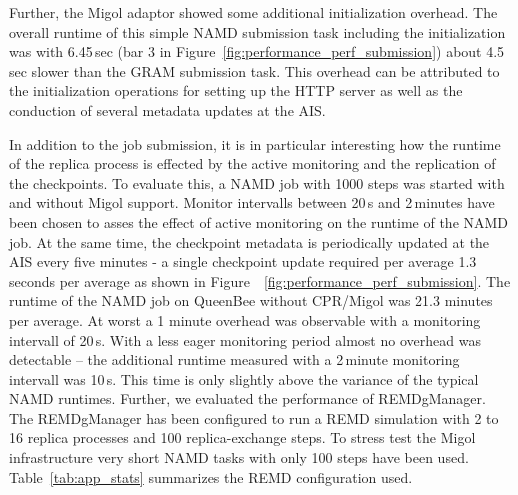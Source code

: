 \documentclass[times, 10pt, twocolumn]{article}
\begin{document}
Further, the Migol adaptor showed some additional initialization overhead.
The overall runtime of this simple NAMD submission task including the 
initialization was with 6.45\,sec (bar 3 in Figure~\ref{fig:performance_perf_submission})
about 4.5\,sec slower than the GRAM submission task. This overhead
can be attributed to the initialization operations for setting 
up the HTTP server as well as the conduction of 
several metadata updates at the AIS.
                                                                                                                    
In addition to the job submission, it is in particular interesting how
the runtime of the replica process is effected by the active
monitoring and the replication of the checkpoints.  To evaluate this,
a NAMD job with 1000 steps was started with and without Migol support.
Monitor intervalls between 20\,s and 2\,minutes have been chosen to asses the effect of active monitoring on the
runtime of the NAMD job. At the same time, the checkpoint metadata is periodically updated
at the AIS every five minutes - a single checkpoint update required per average 1.3\,seconds per average
as shown in Figure~~\ref{fig:performance_perf_submission}. The runtime of the NAMD job on QueenBee
without CPR/Migol was 21.3 minutes per average. At worst a 1 minute overhead was observable with a monitoring 
intervall of 20\,s. With a less eager monitoring period almost no overhead was detectable -- the additional runtime
measured with a 2\,minute monitoring intervall was 10\,s. This time is only slightly above  the variance of the 
typical NAMD runtimes.
Further, we evaluated the performance of REMDgManager. The REMDgManager has been configured 
to run a REMD simulation with 2 to 16 replica processes and 100 replica-exchange
steps. To stress test the Migol infrastructure very short NAMD tasks 
with only 100 steps have been used. Table~\ref{tab:app_stats} summarizes the REMD configuration used.
\end{document}
